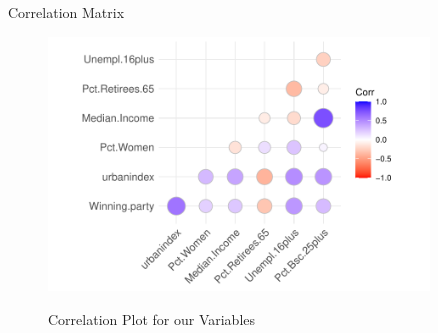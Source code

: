 \documentclass{beamer}
\begin{document}
\begin{frame}{Correlation Matrix}
\begin{figure}
    \centering
    \caption{Correlation Plot for our Variables}
    \includegraphics[width=0.9\textwidth]{plots/corrplot.pdf}
    \label{fig:enter-label}
\end{figure}
\end{frame}
\end{document}
